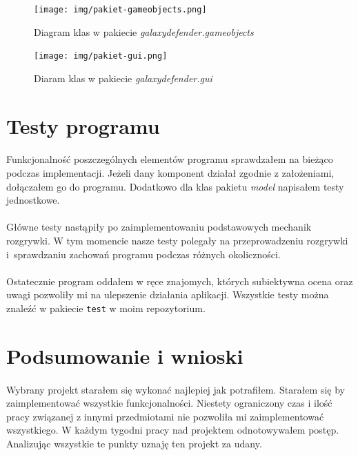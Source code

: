 \documentclass[a4paper]{article}
\newcommand{\prog}{\texttt}
\begin{document}
\begin{figure}[H]
    \centering
    \texttt{[image: img/pakiet-gameobjects.png]}
    \caption{Diagram klas w pakiecie \textit{galaxydefender.gameobjects}}
    \label{fig:pack1}
\end{figure}

\begin{figure}[H]
    \centering
    \texttt{[image: img/pakiet-gui.png]}
    \caption{Diaram klas w pakiecie \textit{galaxydefender.gui}}
    \label{fig:pack1}
\end{figure}

\section{Testy programu}
\paragraph{}Funkcjonalność poszczególnych elementów programu sprawdzałem na bieżąco podczas implementacji.
Jeżeli dany komponent działał zgodnie z założeniami, dołączałem go do programu.
Dodatkowo dla klas pakietu \textit{model} napisałem testy jednostkowe.
\paragraph{}Główne testy nastąpiły po zaimplementowaniu podstawowych mechanik rozgrywki.
W tym momencie nasze testy polegały na przeprowadzeniu rozgrywki i~sprawdzaniu zachowań programu podczas różnych okoliczności.
\paragraph{}Ostatecznie program oddałem w ręce znajomych, których subiektywna ocena oraz uwagi pozwoliły mi na ulepszenie działania aplikacji.
Wszystkie testy można znaleźć w pakiecie \prog{test} w moim repozytorium.

\section{Podsumowanie i wnioski}
\paragraph{}
Wybrany projekt starałem się wykonać najlepiej jak potrafiłem. Starałem się by zaimplementować wszystkie funkcjonalności. Niestety ograniczony czas i ilość pracy związanej z innymi przedmiotami nie pozwoliła mi zaimplementować wszystkiego. W każdym tygodni pracy nad projektem odnotowywałem postęp. Analizując wszystkie te punkty uznaję ten projekt za udany.
\end{document}
